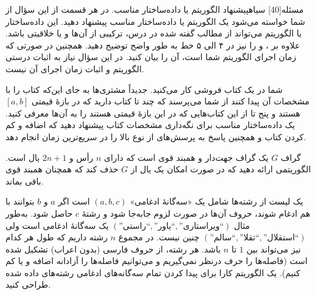 ‌مسئله[40] ‌سیاه{پیشنهاد الگوریتم یا داده‌ساختار مناسب}. در هر قسمت از این سؤال از شما خواسته می‌شود یک الگوریتم یا داده‌ساختار مناسب پیشنهاد دهید. این داده‌ساختار یا الگوریتم می‌تواند از مطالب گفته شده در درس، ترکیبی از آن‌ها و یا خلاقیتی باشد. علاوه بر ،  و  را نیز در ۴ الی ۵ خط به طور واضح توضیح دهید. همچنین در صورتی که زمان اجرای الگوریتم شما  است، آن را بیان کنید. در این سؤال نیاز به اثبات درستی الگوریتم و اثبات زمان اجرای آن نیست.



شما در یک کتاب فروشی کار می‌کنید. جدیداً مشتری‌ها به جای این‌که کتاب را با مشخصات آن پیدا کنند از شما می‌پرسند که چند تا کتاب دارید که در بازۀ قیمتی $[a,b]$ هستند و پنج تا از این کتاب‌هایی که در این بازۀ قیمتی هستند را به آن‌ها معرفی کنید. یک داده‌ساختار مناسب برای نگه‌داری مشخصات کتاب پیشنهاد دهید که اضافه و کم کردن کتاب و همچنین پاسخ به پرسش‌های از نوع بالا را در سریع‌ترین زمان انجام دهد.



گراف $G$ یک گراف جهت‌دار و همبند قوی است که دارای $n$ رأس و $2n+1$ یال است. الگوریتمی ارائه دهید که در صورت امکان یک یال از $G$ حذف کند که همچنان همبند قوی باقی بماند.


\sloppy
{}
یک لیست از رشته‌ها شامل یک «سه‌گانۀ ادغامی» $(a,b,c)$ است اگر $a$ و $b$ بتوانند با هم ادغام شوند، حروف آن‌ها در صورت لزوم جابه‌جا شود و رشتۀ $c$ حاصل شود. به‌طور مثال 
$(\text{''راستی``}, \text{''یاور``}, \text{''ویراستاری``})$ یک سه‌گانۀ ادغامی است ولی 
$(\text{''سالم``}, \text{''تقلا``}, \text{''استقلال``})$
چنین نیست. در مجموع $n$ رشته داریم که طول هر کدام نیز می‌تواند بین $1$ تا $n$ باشد. هر رشته، از حروف فارسی (بدون اعراب) تشکیل شده است (فاصله‌ها را حرف درنظر نمی‌گیریم و می‌توانیم فاصله‌ها را آزادانه اضافه و یا کم کنیم). یک الگوریتم کارا برای پیدا کردن تمام سه‌گانه‌های ادغامی رشته‌های داده شده طراحی کنید.

